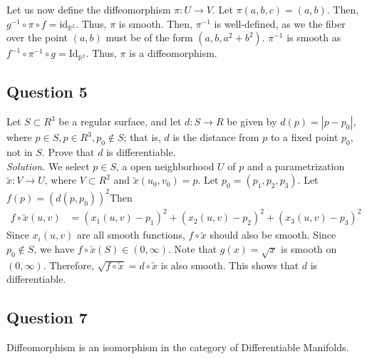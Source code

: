 \documentclass[12pt]{article}
\begin{document}
Let us now define the diffeomorphism 
$\pi : U \to V.$
Let $\pi (a, b, c) = (a, b).$ Then, $g^{-1}\circ\pi \circ f = \mathrm{id}_{\mathbb R^2}.$ Thus, $\pi$ is smooth.
Then, $\pi^{-1}$ is well-defined, as we the fiber over the point $(a, b)$ must be of the form $(a, b, a^2 + b^2).$
$\pi^{-1}$ is smooth as $f^{-1} \circ \pi^{-1} \circ g = \mathrm{Id}_{\mathbb R^2}.$ Thus, $\pi$ is a diffeomorphism.

\subsection*{Question 5}
Let $S \subset R^3$ be a regular surface, and let $d:S\to R$ be given by $d(p)=|p- p_0|$, where $p \in S, p \in R^3, p_0 \notin S$; that is, $d$ is the distance from $p$ to a fixed point $p_0$, not in $S$. Prove that $d$ is differentiable.\\

\textit{Solution.} We select $p\in S$, a open neighborhood $U$ of $p$ and a parametrization $\utilde{x}: V \to U$, where $V\subset R^2$ and $\utilde{x}(u_0,v_0) = p$. Let $p_0=(p_1,p_2,p_3)$. Let $f(p) = (d(p,p_0))^2$Then \begin{align*}
    f\circ\utilde{x}(u,v) &= (x_1(u,v)-p_1)^2+(x_2(u,v)-p_2)^2+(x_3(u,v)-p_3)^2
\end{align*}
Since $x_i(u,v)$ are all smooth functions, $f\circ \utilde{x}$ should also be smooth. Since $p_0\notin S$, we have $f\circ\utilde{x}(S)\in (0,\infty)$. Note that $g(x)=\sqrt{x}$ is smooth on $(0,\infty)$. Therefore, $\sqrt{f\circ\utilde{x}} = d\circ\utilde{x}$ is also smooth. This shows that $d$ is differentiable.

\subsection*{Question 7}

\begin{theorem} Diffeomorphism is an isomorphism in the category of Differentiable Manifolds.
\end{theorem}
\end{document}
